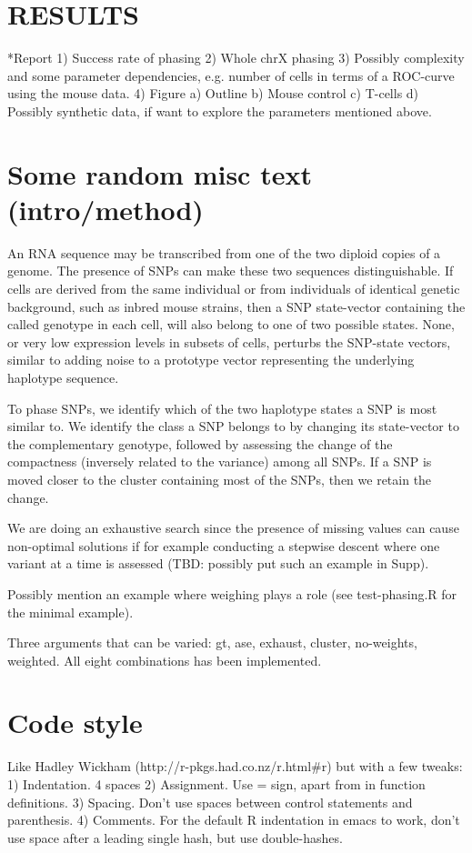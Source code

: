 \section{RESULTS}
*Report
1) Success rate of phasing
2) Whole chrX phasing
3) Possibly complexity and some parameter dependencies, e.g. number of
cells in terms of a ROC-curve using the mouse data.
4) Figure
a) Outline
b) Mouse control
c) T-cells
d) Possibly synthetic data, if want to explore the parameters mentioned above.


\section{Some random misc text (intro/method)}
An RNA sequence may be transcribed from one of the two diploid copies of a genome. The presence of SNPs can make these two sequences distinguishable. If cells are derived from the same individual or from individuals of identical genetic background, such as inbred mouse strains, then a SNP state-vector containing the called genotype in each cell, will also belong to one of two possible states. None, or very low expression levels in subsets of cells, perturbs the SNP-state vectors, similar to adding noise to a prototype vector representing the underlying haplotype sequence. 

To phase SNPs, we identify which of the two haplotype states a SNP is most similar to. We identify the class a SNP belongs to by changing its state-vector to the complementary genotype, followed by assessing the change of the compactness (inversely related to the variance) among all SNPs. If a SNP is moved closer to the cluster containing most of the SNPs, then we retain the change. 

We are doing an exhaustive search since the presence of missing values
can cause non-optimal solutions if for example conducting a stepwise
descent where one variant at a time is assessed (TBD: possibly put
such an example in Supp).

Possibly mention an example where weighing plays a role (see
test-phasing.R for the minimal example).

Three arguments that can be varied: {gt, ase}, {exhaust, cluster},
{no-weights, weighted}. All eight combinations has been implemented.

\section{Code style}
Like Hadley Wickham (http://r-pkgs.had.co.nz/r.html#r) but with a few tweaks:
1) Indentation. 4 spaces
2) Assignment. Use = sign, apart from in function definitions.
3) Spacing. Don't use spaces between control statements and parenthesis.
4) Comments. For the default R indentation in emacs to work, don't use space
after a leading single hash, but use double-hashes.